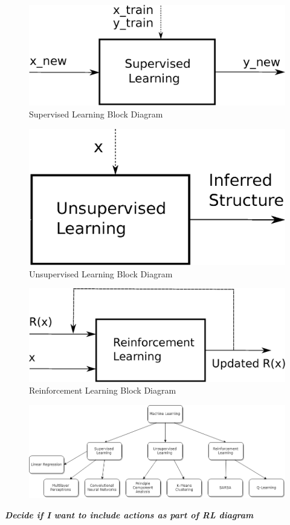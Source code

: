 	\begin{figure}[ht]
		\centering
		\includegraphics[scale=0.4]{figures/supervisedLearningBlock.eps}
		\caption{Supervised Learning Block Diagram}
	\end{figure}
	\begin{figure}[ht]
		\centering
		\includegraphics[scale=0.4]{figures/unsupervisedLearningBlock.eps}
		\caption{Unsupervised Learning Block Diagram}
	\end{figure}
	\begin{figure}[ht]
	\centering
	\includegraphics[scale=0.4]{figures/reinforcementLearningBlock.eps}
	\caption{Reinforcement Learning Block Diagram}
	\end{figure}
	\begin{figure}[ht]
		\centering
		\includegraphics[scale=0.5]{figures/MLdiagram.png}
	\end{figure}
	\par \textbf{\textit{Decide if I want to include actions as part of RL diagram}}
	
